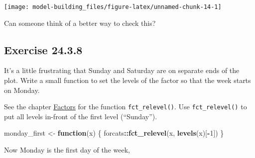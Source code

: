 \documentclass[]{book}
\newenvironment{Shaded}{\begin{snugshade}}{\end{snugshade}}
\newcommand{\ControlFlowTok}[1]{\textcolor[rgb]{0.13,0.29,0.53}{\textbf{#1}}}
\newcommand{\DataTypeTok}[1]{\textcolor[rgb]{0.13,0.29,0.53}{#1}}
\newcommand{\DecValTok}[1]{\textcolor[rgb]{0.00,0.00,0.81}{#1}}
\newcommand{\KeywordTok}[1]{\textcolor[rgb]{0.13,0.29,0.53}{\textbf{#1}}}
\newcommand{\NormalTok}[1]{#1}
\newcommand{\OperatorTok}[1]{\textcolor[rgb]{0.81,0.36,0.00}{\textbf{#1}}}
\newcommand{\OtherTok}[1]{\textcolor[rgb]{0.56,0.35,0.01}{#1}}
\newcommand{\StringTok}[1]{\textcolor[rgb]{0.31,0.60,0.02}{#1}}
\theoremstyle{plain}
\theoremstyle{remark}
\begin{document}
\begin{center}\texttt{[image: model-building\_files/figure-latex/unnamed-chunk-14-1]} \end{center}

Can someone think of a better way to check this?

\hypertarget{exercise-24.3.8}{%
\subsection*{\texorpdfstring{Exercise
{24.3.8}}{Exercise 24.3.8}}\label{exercise-24.3.8}}

It's a little frustrating that Sunday and Saturday are on separate ends
of the plot. Write a small function to set the levels of the factor so
that the week starts on Monday.

See the chapter \href{http://r4ds.had.co.nz/factors.html}{Factors} for
the function \texttt{fct\_relevel()}. Use \texttt{fct\_relevel()} to put
all levels in-front of the first level (``Sunday'').

\begin{Shaded}
\begin{Highlighting}[]
\NormalTok{monday_first <-}\StringTok{ }\ControlFlowTok{function}\NormalTok{(x) \{}
\NormalTok{  forcats}\OperatorTok{::}\KeywordTok{fct_relevel}\NormalTok{(x, }\KeywordTok{levels}\NormalTok{(x)[}\OperatorTok{-}\DecValTok{1}\NormalTok{])  }
\NormalTok{\}}
\end{Highlighting}
\end{Shaded}

Now Monday is the first day of the week,

\begin{Shaded}
\end{Shaded}
\end{document}
